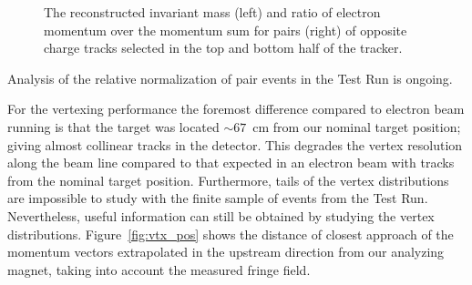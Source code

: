 \begin{figure}[ht]
\caption{\small{The reconstructed invariant mass (left) and ratio of electron momentum over the momentum sum for pairs (right) of opposite charge tracks selected in the top and bottom half of the tracker.}}
\label{fig:pair_kin}
\end{figure}
Analysis of the relative normalization of pair events in the Test Run is ongoing.

For the vertexing 
performance the foremost difference compared to electron beam running is that the target was 
located $\sim67$~cm from our nominal target position; giving almost collinear tracks in the detector. This 
degrades the vertex resolution along the 
beam line compared to that expected in an electron beam with tracks from the nominal target position. 
Furthermore, tails of the vertex distributions are impossible to study with the finite sample of events from the 
Test Run. 
Nevertheless, useful information can still be 
obtained by studying the vertex distributions. Figure~\ref{fig:vtx_pos} shows the distance of closest 
approach of the momentum vectors extrapolated in the 
upstream direction from our analyzing magnet, taking into account the measured fringe field. 
